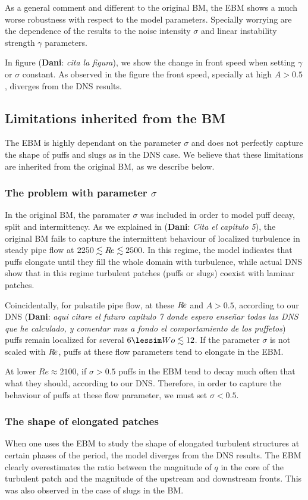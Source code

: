 \documentclass{article}
\DeclareRobustCommand{\dm}[1]{{\color{blue}(\textbf{Dani}: \textit{#1}\xspace)}}
\DeclareRobustCommand{\Reynolds}{\ensuremath{R\hspace{-0.1em}e}\xspace}     %
\DeclareRobustCommand{\Amplitude}{\ensuremath{A}\xspace}    %
\begin{document}
As a general comment and different to the original BM, the EBM shows a much worse robustness with respect to the model parameters. Specially worrying are the dependence of the results to the noise intensity $\sigma$ and linear instability strength $\gamma$ parameters. 

In figure \dm{cita la figura}, we show the change in front speed when setting $\gamma$ or $\sigma$ constant. As observed in the figure the front speed, specially at high $\Amplitude>0.5$, diverges from the DNS results. 

\subsection{Limitations inherited from the BM}
The EBM is highly dependant on the parameter $\sigma$ and does not perfectly capture the shape of puffs and slugs as in the DNS case. We believe that these limitations are inherited from the original BM, as we describe below.

\subsubsection{The problem with parameter $\sigma$}
In the original BM, the paramater $\sigma$ was included in order to model puff decay, split and intermittency. As we explained in \dm{Cita el capitulo 5}, the original BM fails to capture the intermittent behaviour of localized turbulence in steady pipe flow at $2250 \lesssim \Reynolds \lesssim 2500$. In this regime, the model indicates that puffs elongate until they fill the whole domain with turbulence, while actual DNS show that in this regime turbulent patches (puffs or slugs) coexist with laminar patches. 

Coincidentally, for pulsatile pipe flow, at these $\Reynolds$ and $A>0.5$, according to our DNS \dm{aqui citare el futuro capitulo 7 donde espero enseñar todas las DNS que he calculado, y comentar mas a fondo el comportamiento de los puffetos} puffs remain localized for several $6\lessim Wo \lesssim 12$. If the parameter $\sigma$ is not scaled with $\Reynolds$, puffs at these flow parameters tend to elongate in the EBM. 

At lower $Re\approx 2100$, if $\sigma>0.5$ puffs in the EBM tend to decay much often that what they should, according to our DNS. Therefore, in order to capture the behaviour of puffs at these flow parameter, we must set $\sigma<0.5$. 

\subsubsection{The shape of elongated patches}
When one uses the EBM to study the shape of elongated turbulent structures at certain phases of the period, the model diverges from the DNS results. The EBM clearly overestimates the ratio between the magnitude of $q$ in the core of the turbulent patch and the magnitude of the upstream and downstream fronts. This was also observed in the case of slugs in the BM.
\end{document}
